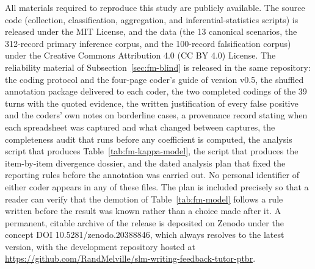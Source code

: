 \documentclass{sbc2023}%
\begin{document}
\begin{materials}
All materials required to reproduce this study are publicly available. The source code (collection, classification, aggregation, and inferential-statistics scripts) is released under the MIT License, and the data (the 13 canonical scenarios, the 312-record primary inference corpus, and the 100-record falsification corpus) under the Creative Commons Attribution 4.0 (CC BY 4.0) License. The reliability material of Subsection~\ref{sec:fm-blind} is released in the same repository: the coding protocol and the four-page coder's guide of version v0.5, the shuffled annotation package delivered to each coder, the two completed codings of the 39 turns with the quoted evidence, the written justification of every false positive and the coders' own notes on borderline cases, a provenance record stating when each spreadsheet was captured and what changed between captures, the completeness audit that runs before any coefficient is computed, the analysis script that produces Table~\ref{tab:fm-kappa-model}, the script that produces the item-by-item divergence dossier, and the dated analysis plan that fixed the reporting rules before the annotation was carried out. No personal identifier of either coder appears in any of these files. The plan is included precisely so that a reader can verify that the demotion of Table~\ref{tab:fm-model} follows a rule written before the result was known rather than a choice made after it. A permanent, citable archive of the release is deposited on Zenodo under the concept DOI 10.5281/zenodo.20388846, which always resolves to the latest version, with the development repository hosted at \href{https://github.com/RandMelville/slm-writing-feedback-tutor-ptbr}{https://github.com/RandMelville/slm-writing-feedback-tutor-ptbr}.
\end{materials}




\end{document}
